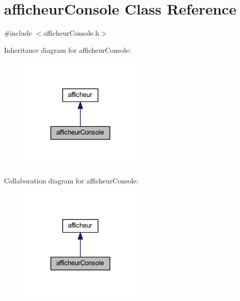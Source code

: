 \hypertarget{classafficheur_console}{}\section{afficheur\+Console Class Reference}
\label{classafficheur_console}


{\ttfamily \#include $<$afficheur\+Console.\+h$>$}



Inheritance diagram for afficheur\+Console\+:\nopagebreak
\begin{figure}[H]
\begin{center}
\leavevmode
\includegraphics[width=168pt]{classafficheur_console__inherit__graph}
\end{center}
\end{figure}


Collaboration diagram for afficheur\+Console\+:\nopagebreak
\begin{figure}[H]
\begin{center}
\leavevmode
\includegraphics[width=168pt]{classafficheur_console__coll__graph}
\end{center}
\end{figure}
